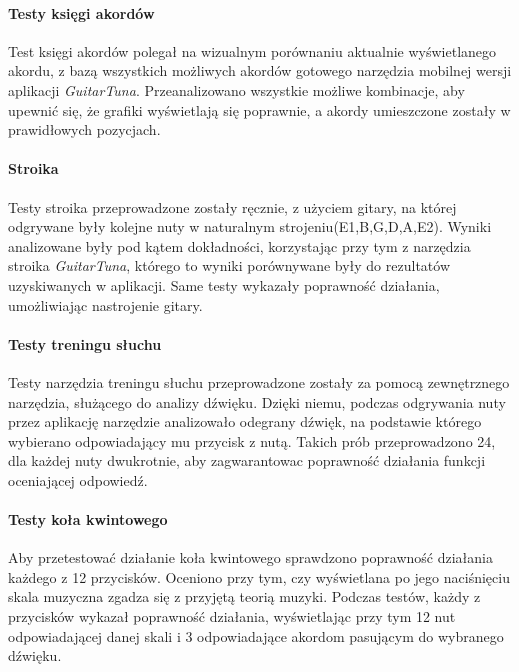 \paragraph{Testy księgi akordów}

Test księgi akordów polegał na wizualnym porównaniu aktualnie wyświetlanego akordu, z bazą wszystkich możliwych akordów gotowego narzędzia mobilnej wersji aplikacji \emph{GuitarTuna}.  Przeanalizowano wszystkie możliwe kombinacje, aby upewnić się, że grafiki wyświetlają się poprawnie, a akordy umieszczone zostały w prawidłowych pozycjach.

\paragraph{Stroika}

Testy stroika przeprowadzone zostały ręcznie, z użyciem gitary, na której odgrywane były kolejne nuty w naturalnym strojeniu(E1,B,G,D,A,E2). Wyniki analizowane były pod kątem dokładności, korzystając przy tym z narzędzia stroika \emph{GuitarTuna}, którego to wyniki porównywane były do rezultatów uzyskiwanych w aplikacji. Same testy wykazały poprawność działania, umożliwiając nastrojenie gitary. 

\paragraph{Testy treningu słuchu}

Testy narzędzia treningu słuchu przeprowadzone zostały za pomocą zewnętrznego narzędzia, służącego do analizy dźwięku. Dzięki niemu, podczas odgrywania nuty przez aplikację narzędzie analizowało odegrany dźwięk, na podstawie którego wybierano odpowiadający mu przycisk z nutą. Takich prób przeprowadzono 24, dla każdej nuty dwukrotnie, aby zagwarantowac poprawność działania funkcji oceniającej odpowiedź.

\paragraph{Testy koła kwintowego}

Aby przetestować działanie koła kwintowego sprawdzono poprawność działania każdego z 12 przycisków. Oceniono przy tym, czy wyświetlana po jego naciśnięciu skala muzyczna zgadza się z przyjętą teorią muzyki. Podczas testów, każdy z przycisków wykazał poprawność działania, wyświetlając przy tym 12 nut odpowiadającej danej skali i 3 odpowiadające akordom pasującym do wybranego dźwięku. 